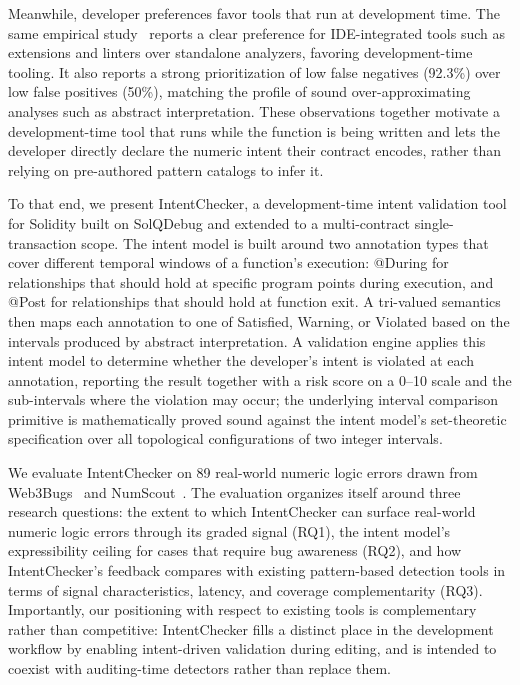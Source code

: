 \documentclass[pdflatex,sn-basic]{sn-jnl}%
\theoremstyle{thmstyleone}%
\theoremstyle{thmstyletwo}%
\theoremstyle{thmstylethree}%
\begin{document}
Meanwhile, developer preferences favor tools that run at development time. The same empirical study~\citep{defisecurity} reports a clear preference for IDE-integrated tools such as extensions and linters over standalone analyzers, favoring development-time tooling. It also reports a strong prioritization of low false negatives (92.3\%) over low false positives (50\%), matching the profile of sound over-approximating analyses such as abstract interpretation.
These observations together motivate a development-time tool that runs while the function is being written and lets the developer directly declare the numeric intent their contract encodes, rather than relying on pre-authored pattern catalogs to infer it.

To that end, we present IntentChecker, a development-time intent validation tool for Solidity built on SolQDebug and extended to a multi-contract single-transaction scope.
The intent model is built around two annotation types that cover different temporal windows of a function's execution: @During for relationships that should hold at specific program points during execution, and @Post for relationships that should hold at function exit. A tri-valued semantics then maps each annotation to one of Satisfied, Warning, or Violated based on the intervals produced by abstract interpretation.
A validation engine applies this intent model to determine whether the developer's intent is violated at each annotation, reporting the result together with a risk score on a 0--10 scale and the sub-intervals where the violation may occur; the underlying interval comparison primitive is mathematically proved sound against the intent model's set-theoretic specification over all topological configurations of two integer intervals.

We evaluate IntentChecker on 89 real-world numeric logic errors drawn from Web3Bugs~\citep{exploitablebugs} and NumScout~\citep{numscout}.
The evaluation organizes itself around three research questions: the extent to which IntentChecker can surface real-world numeric logic errors through its graded signal (RQ1), the intent model's expressibility ceiling for cases that require bug awareness (RQ2), and how IntentChecker's feedback compares with existing pattern-based detection tools in terms of signal characteristics, latency, and coverage complementarity (RQ3).
Importantly, our positioning with respect to existing tools is complementary rather than competitive: IntentChecker fills a distinct place in the development workflow by enabling intent-driven validation during editing, and is intended to coexist with auditing-time detectors rather than replace them.
\end{document}
